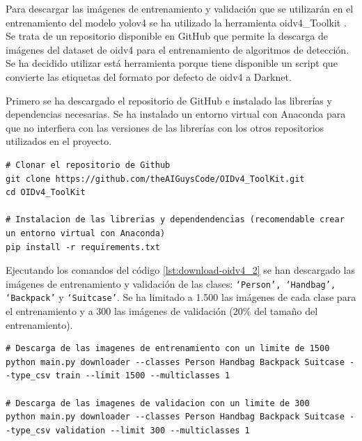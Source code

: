 Para descargar las imágenes de entrenamiento y validación que se utilizarán en el entrenamiento del modelo \gls{yolov4} se ha utilizado la herramienta \gls{oidv4}\_Toolkit \cite{OIDv4_ToolKit}. Se trata de un repositorio disponible en GitHub que permite la descarga de imágenes del dataset de \gls{oidv4} para el entrenamiento de algoritmos de detección. Se ha decidido utilizar está herramienta porque tiene disponible un script que convierte las etiquetas del formato por defecto de \gls{oidv4} a Darknet.

Primero se ha descargado el repositorio de GitHub \cite{OIDv4_ToolKit} e instalado las librerías y dependencias necesarias. Se ha instalado un entorno virtual con Anaconda para que no interfiera con las versiones de las librerías con los otros repositorios utilizados en el proyecto.

\vspace{0.5cm}
\begin{lstlisting}[language=iPython,caption=Descarga dataset Open Images Dataset v4 (1),captionpos=b,label={lst:download-oidv4_1}]
# Clonar el repositorio de Github
git clone https://github.com/theAIGuysCode/OIDv4_ToolKit.git
cd OIDv4_ToolKit

# Instalacion de las librerias y dependendencias (recomendable crear un entorno virtual con Anaconda)
pip install -r requirements.txt
\end{lstlisting}

Ejecutando los comandos del código \ref{lst:download-oidv4_2} se han descargado las imágenes de entrenamiento y validación de las clases: \texttt{`Person', `Handbag', `Backpack'} y \texttt{`Suitcase'}. Se ha limitado a 1.500 las imágenes de cada clase para el entrenamiento y a 300 las imágenes de validación (20\% del tamaño del entrenamiento).

\vspace{0.5cm}
\begin{lstlisting}[language=iPython,caption=Descarga dataset Open Images Dataset v4 (2),captionpos=b,label={lst:download-oidv4_2}]
# Descarga de las imagenes de entrenamiento con un limite de 1500
python main.py downloader --classes Person Handbag Backpack Suitcase --type_csv train --limit 1500 --multiclasses 1

# Descarga de las imagenes de validacion con un limite de 300
python main.py downloader --classes Person Handbag Backpack Suitcase --type_csv validation --limit 300 --multiclasses 1
\end{lstlisting}


